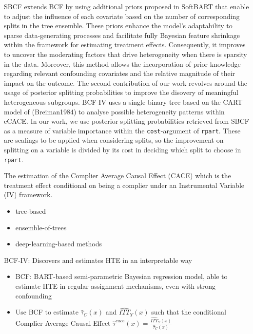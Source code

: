 SBCF extends BCF by using additional priors proposed in SoftBART that enable to adjust the influence of each covariate based on the number of corresponding splits in the tree ensemble.
These priors enhance the model's adaptability to sparse data-generating processes and facilitate fully Bayesian feature shrinkage within the framework for estimating treatment effects.
Consequently, it improves to uncover the moderating factors that drive heterogeneity when there is sparsity in the data.  
Moreover, this method allows the incorporation of prior knowledge regarding relevant confounding covariates and the relative magnitude of their impact on the outcome.
The second contribution of our work revolves around the usage of posterior splitting probabilities to improve the disovery of meaningful heterogeneous subgroups. BCF-IV uses a single binary tree based on the CART model of (Breiman1984) to analyse possible heterogeneity patterns within cCACE.
In our work, we use posterior splitting probabilities retrieved from SBCF as a measure of variable importance within the \texttt{cost}-argument of \texttt{rpart}. These are scalings to be applied when considering splits, so the improvement on splitting on a variable is divided by its cost in deciding which split to choose in \texttt{rpart}. 

The estimation of the Complier Average Causal Effect (CACE) which is the treatment effect conditional on being a complier under an Instrumental Variable (IV) framework.




\begin{itemize}
    \item tree-based 
    \item ensemble-of-trees 
    \item deep-learning-based methods 
\end{itemize}

BCF-IV: Discovers and estimates HTE in an interpretable way %
\begin{itemize}
    \item BCF: BART-based semi-parametric Bayesian regression model, able to estimate HTE in regular assignment mechanisms, even with strong confounding %
    \item Use BCF to estimate $\hat\tau_C(x)$ and  $\widehat{ITT}_{Y}(x)$ such that the conditional Complier Average Causal Effect $\hat\tau^{cace}(x) = \frac{\widehat{ITT}_{Y}(x)}{\hat\tau_C(x)}$
\end{itemize}



